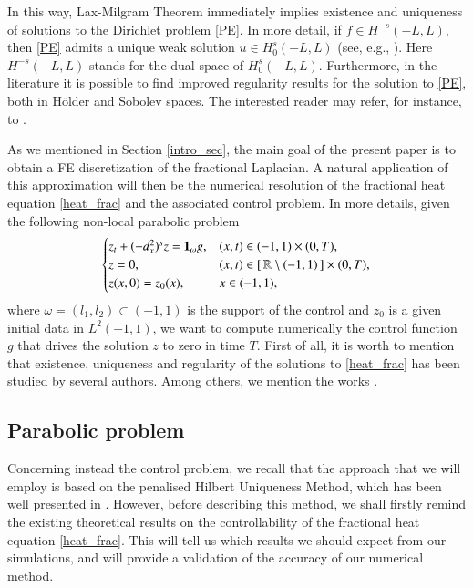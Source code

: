 In this way, Lax-Milgram Theorem immediately implies existence and uniqueness of solutions to the Dirichlet problem \eqref{PE}. In more detail, if $f\in H^{-s}(-L,L)$, then \eqref{PE} admits a unique weak solution $u\in H_0^s(-L,L)$ (see, e.g., \cite[Proposition 2.1]{biccari2017local}). Here $H^{-s}(-L,L)$ stands for the dual space of $H^s_0(-L,L)$. Furthermore, in the literature it is possible to find improved regularity results for the solution to \eqref{PE}, both in H\"older and Sobolev spaces. The interested reader may refer, for instance, to \cite{acosta2017fractional,biccari2017local,leonori2015basic,ros2014dirichlet,ros2014extremal}.

As we mentioned in Section \ref{intro_sec}, the main goal of the present paper is to obtain a FE discretization of the fractional Laplacian. A natural application of this approximation will then be the numerical resolution of the fractional heat equation \ref{heat_frac} and the associated control problem. In more details, given the following non-local parabolic problem 
\begin{align*}
	\begin{cases}
		z_t+(-d_x^2)^{s}z =\mathbf{1}_\omega g, & (x,t)\in (-1,1)\times (0,T), 
		\\
		z=0, & (x,t)\in [\,\mathbb{R} \setminus (-1,1)\,]\times (0,T), 
		\\
		z(x,0)=z_0(x), & x\in (-1,1),
	\end{cases}
\end{align*}
where $\omega=(l_1,l_2)\subset (-1,1)$ is the support of the control and $z_0$ is a given initial data in $L^2(-1,1)$, we want to compute numerically the control function $g$ that drives the solution $z$ to zero in time $T$. First of all, it is worth to mention that existence, uniqueness and regularity of the solutions to \eqref{heat_frac} has been studied by several authors. Among others, we mention the works \cite{biccari2017local,fernandez2016boundary,leonori2015basic}.

\subsection{Parabolic problem}

Concerning instead the control problem, we recall that the approach that we will employ is based on the penalised Hilbert Uniqueness Method, which has been well presented in \cite{boyer2013penalised}. However, before describing this method, we shall firstly remind the existing theoretical results on the controllability of the fractional heat equation \eqref{heat_frac}. This will tell us which results we should expect from our simulations, and will provide a validation of the accuracy of our numerical method.

